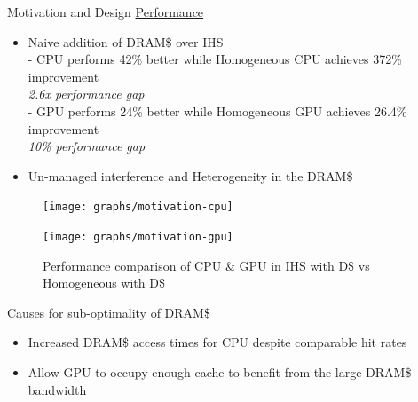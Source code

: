 \documentclass[final,t]{beamer}
\begin{document}
\begin{frame}[t,fragile]{}
    
\begin{columns}[t]

\begin{column}{.48\linewidth}
\begin{tcolorbox}[colback=red!5!white,
                  colframe=red!75!black,
                 ]
    \begin{exampleblock}{Motivation and Design}
    \centering 
    \underline{Performance}

    \begin{itemize}
      	\item Naive addition of DRAM\$ over IHS \\
      		\qquad - CPU performs 42\% better while Homogeneous CPU achieves 372\% improvement  \\
      		\qquad \qquad \emph{\color{red}2.6x performance gap}\\
      		\qquad - GPU performs 24\% better while Homogeneous GPU achieves 26.4\% improvement \\ 
      		\qquad \qquad \emph{10\% performance gap}\\
      	\item Un-managed interference and Heterogeneity in the DRAM\$
    \end{itemize}
    \begin{figure}
       \texttt{[image: graphs/motivation-cpu]}
    \end{figure}
    \begin{figure}
       \texttt{[image: graphs/motivation-gpu]}
       \caption{Performance comparison of CPU \& GPU in IHS with D\$ vs Homogeneous with D\$}
       \label{fig:motivation}
    \end{figure}
    
    \underline{Causes for sub-optimality of DRAM\$}
    \begin{itemize}
   		\item Increased DRAM\$ access times for CPU despite comparable hit rates
        \item Allow GPU to occupy enough cache to benefit from the large DRAM\$ bandwidth
    \end{itemize}
    

\end{exampleblock}
\end{tcolorbox}
\end{column}
\end{columns}
\end{frame}
\end{document}
